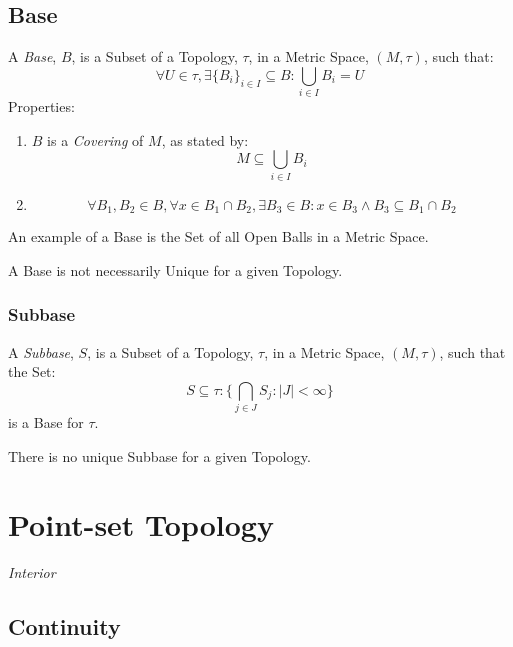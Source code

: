\documentclass{article}
\begin{document}
\subsection{Base}\label{subsec:topological_base}

A \emph{Base}, $B$, is a Subset of a Topology, $\tau$, in a Metric
Space, $(M,\tau)$, such that:
\[
    \forall U \in \tau, \exists \{B_i\}_{i \in I} \subseteq B :
    \bigcup_{i \in I}B_i = U
\]
Properties:
\begin{enumerate}
    \item $B$ is a \emph{Covering} of $M$, as stated by:
\[
    M \subseteq \bigcup_{i \in I} B_i
\]

    \item
\[
    \forall B_1, B_2 \in B, \forall x \in B_1 \cap B_2,
    \exists B_3 \in B : x \in B_3 \wedge B_3 \subseteq B_1 \cap B_2
\]

\end{enumerate}
An example of a Base is the Set of all Open Balls in a Metric Space.

A Base is not necessarily Unique for a given Topology.

\subsubsection{Subbase}

A \emph{Subbase}, $S$, is a Subset of a Topology, $\tau$, in a Metric
Space, $(M,\tau)$, such that the Set:
\[
    S \subseteq \tau : \{ \bigcap_{j \in J} S_j : |J| < \infty \}
\]
is a Base for $\tau$.

There is no unique Subbase for a given Topology.

\section{Point-set Topology}\label{sec:point_set}

\emph{Interior}

\subsection{Continuity}\label{subsec:topological_continuity}
\end{document}

